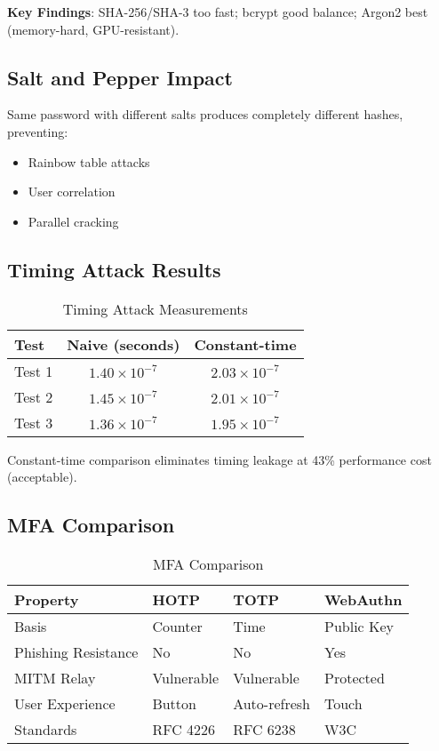 \documentclass[12pt,a4paper]{article}
\begin{document}
\textbf{Key Findings}: SHA-256/SHA-3 too fast; bcrypt good balance; Argon2 best (memory-hard, GPU-resistant).

\subsection{Salt and Pepper Impact}

Same password with different salts produces completely different hashes, preventing:
\begin{itemize}
\item Rainbow table attacks
\item User correlation
\item Parallel cracking
\end{itemize}

\subsection{Timing Attack Results}

\begin{table}[H]
\centering
\begin{tabular}{lcc}
\toprule
Test & Naive (seconds) & Constant-time \\
\midrule
Test 1 & $1.40 \times 10^{-7}$ & $2.03 \times 10^{-7}$ \\
Test 2 & $1.45 \times 10^{-7}$ & $2.01 \times 10^{-7}$ \\
Test 3 & $1.36 \times 10^{-7}$ & $1.95 \times 10^{-7}$ \\
\bottomrule
\end{tabular}
\caption{Timing Attack Measurements}
\end{table}

Constant-time comparison eliminates timing leakage at 43\% performance cost (acceptable).

\subsection{MFA Comparison}

\begin{table}[H]
\centering
\small
\begin{tabularx}{\textwidth}{lXXX}
\toprule
Property & HOTP & TOTP & WebAuthn \\
\midrule
Basis & Counter & Time & Public Key \\
Phishing Resistance & No & No & Yes \\
MITM Relay & Vulnerable & Vulnerable & Protected \\
User Experience & Button & Auto-refresh & Touch \\
Standards & RFC 4226 & RFC 6238 & W3C \\
\bottomrule
\end{tabularx}
\caption{MFA Comparison}
\end{table}
\end{document}
